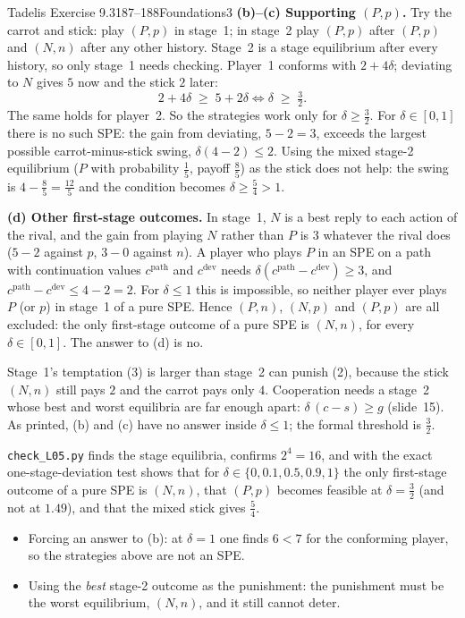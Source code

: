 \begin{exsol}{Tadelis Exercise 9.3}{187--188}{Foundations}{3}
\textbf{(b)--(c) Supporting $(P,p)$.} Try the carrot and stick: play $(P,p)$ in stage~1; in stage~2 play
$(P,p)$ after $(P,p)$ and $(N,n)$ after any other history. Stage~2 is a stage equilibrium after every
history, so only stage~1 needs checking. Player~1 conforms with $2 + 4\delta$; deviating to $N$ gives
$5$ now and the stick $2$ later:
\[
  2 + 4\delta \;\ge\; 5 + 2\delta \iff \delta \;\ge\; \tfrac32 .
\]
The same holds for player~2. So the strategies work only for $\delta \ge \frac32$. For
$\delta \in [0,1]$ there is no such SPE: the gain from deviating, $5 - 2 = 3$, exceeds the largest possible
carrot-minus-stick swing, $\delta(4 - 2) \le 2$. Using the mixed stage-2 equilibrium ($P$ with probability
$\frac15$, payoff $\frac85$) as the stick does not help: the swing is $4 - \frac85 = \frac{12}{5}$ and the
condition becomes $\delta \ge \frac54 > 1$.

\textbf{(d) Other first-stage outcomes.} In stage~1, $N$ is a best reply to each action of the rival, and
the gain from playing $N$ rather than $P$ is $3$ whatever the rival does ($5 - 2$ against $p$, $3 - 0$
against $n$). A player who plays $P$ in an SPE on a path with continuation values $c^{\text{path}}$
and $c^{\text{dev}}$ needs $\delta(c^{\text{path}} - c^{\text{dev}}) \ge 3$, and
$c^{\text{path}} - c^{\text{dev}} \le 4 - 2 = 2$. For $\delta \le 1$ this is impossible, so neither player
ever plays $P$ (or $p$) in stage~1 of a pure SPE. Hence $(P,n)$, $(N,p)$ and $(P,p)$ are all excluded:
the only first-stage outcome of a pure SPE is $(N,n)$, for every $\delta\in[0,1]$. The answer to (d) is no.

\interp Stage~1's temptation (3) is larger than stage~2 can punish (2), because the stick $(N,n)$
still pays $2$ and the carrot pays only $4$. Cooperation needs a stage~2 whose best and worst
equilibria are far enough apart: $\delta\,(c - s) \ge g$ (slide~15). As printed, (b) and (c) have no
answer inside $\delta \le 1$; the formal threshold is $\frac32$.

\verify \texttt{check\_L05.py} finds the stage equilibria, confirms $2^4 = 16$, and with the exact
one-stage-deviation test shows that for $\delta \in \{0, 0.1, 0.5, 0.9, 1\}$ the only first-stage
outcome of a pure SPE is $(N,n)$, that $(P,p)$ becomes feasible at $\delta = \frac32$ (and not at $1.49$),
and that the mixed stick gives $\frac54$.

\mistakes
\begin{itemize}
  \item Forcing an answer to (b): at $\delta = 1$ one finds $6 < 7$ for the conforming player, so the
  strategies above are not an SPE.
  \item Using the \emph{best} stage-2 outcome as the punishment: the punishment must be the worst
  equilibrium, $(N,n)$, and it still cannot deter.
\end{itemize}


\end{exsol}
